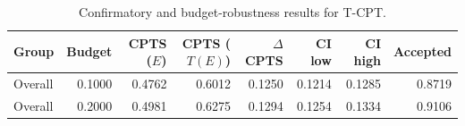 \begin{table}[t]
\caption{Confirmatory and budget-robustness results for T-CPT.}
\label{tab:tcpt_overall}
\begin{tabular}{lrrrrrrr}
\toprule
Group & Budget & CPTS ($E$) & CPTS ($T(E)$) & $\Delta$CPTS & CI low & CI high & Accepted \\
\midrule
Overall & 0.1000 & 0.4762 & 0.6012 & 0.1250 & 0.1214 & 0.1285 & 0.8719 \\
Overall & 0.2000 & 0.4981 & 0.6275 & 0.1294 & 0.1254 & 0.1334 & 0.9106 \\
\bottomrule
\end{tabular}
\end{table}
